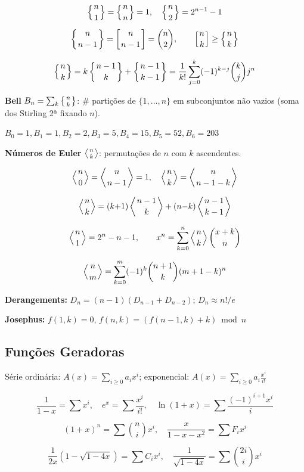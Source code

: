 \[\left\{{n\atop 1}\right\}=\left\{{n\atop n}\right\}=1, \quad \left\{{n\atop 2}\right\}=2^{n-1}-1\]

\[\left\{{n\atop n-1}\right\}=\left[{n\atop n-1}\right]=\binom{n}{2}, \qquad \left[{n\atop k}\right]\geq\left\{{n\atop k}\right\}\]

\[\left\{{n\atop k}\right\}=k\left\{{n-1\atop k}\right\}+\left\{{n-1\atop k-1}\right\} = \frac{1}{k!}\sum_{j=0}^{k}(-1)^{k-j}\binom{k}{j}j^n\]

\textbf{Bell} $B_n=\sum_k\left\{{n\atop k}\right\}$: \# partições de $\{1,\ldots,n\}$ em subconjuntos não vazios (soma dos Stirling 2ª fixando $n$).

$B_0{=}1,B_1{=}1,B_2{=}2,B_3{=}5,B_4{=}15,B_5{=}52,B_6{=}203$

\vspace{8pt}

\textbf{Números de Euler} $\left\langle{n\atop k}\right\rangle$: permutações de $n$ com $k$ ascendentes.

\[\left\langle{n\atop 0}\right\rangle=\left\langle{n\atop n-1}\right\rangle=1, \quad \left\langle{n\atop k}\right\rangle=\left\langle{n\atop n-1-k}\right\rangle\]

\[\left\langle{n\atop k}\right\rangle=(k{+}1)\left\langle{n-1\atop k}\right\rangle+(n{-}k)\left\langle{n-1\atop k-1}\right\rangle\]

\[\left\langle{n\atop 1}\right\rangle=2^n-n-1, \qquad x^n=\sum_{k=0}^n\left\langle{n\atop k}\right\rangle\binom{x+k}{n}\]

\[\left\langle{n\atop m}\right\rangle=\sum_{k=0}^m(-1)^k\binom{n+1}{k}(m+1-k)^n\]

\textbf{Derangements:} $D_n=(n{-}1)(D_{n-1}+D_{n-2})$; $D_n\approx n!/e$

\textbf{Josephus:} $f(1,k)=0$, $f(n,k)=(f(n{-}1,k)+k)\bmod n$

\subsection{Funções Geradoras}

Série ordinária: $A(x)=\sum_{i\geq0}a_ix^i$; exponencial: $A(x)=\sum_{i\geq0}a_i\frac{x^i}{i!}$

\[\frac{1}{1-x}=\sum x^i, \quad e^x=\sum\frac{x^i}{i!}, \quad \ln(1+x)=\sum\frac{(-1)^{i+1}x^i}{i}\]

\[(1+x)^n=\sum\binom{n}{i}x^i, \quad \frac{x}{1-x-x^2}=\sum F_ix^i\]

\[\frac{1}{2x}\!\left(1-\sqrt{1-4x}\right)=\sum C_ix^i, \quad \frac{1}{\sqrt{1-4x}}=\sum\binom{2i}{i}x^i\]


